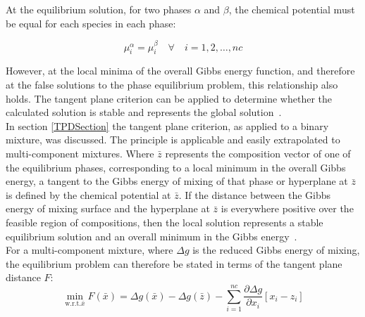 At the equilibrium solution, for two phases $\alpha$ and $\beta$, the chemical potential must be equal for each species in each phase:\

\begin{equation}
\mu_{i}^{\alpha} = \mu_{i}^{\beta} \quad \forall \quad i = 1, 2,\ldots, nc
\end{equation}
	

However, at the local  minima of the overall Gibbs energy function, and therefore at the false solutions to the phase equilibrium problem, this relationship also holds. The tangent plane criterion can be applied to determine whether the calculated solution is stable and represents the global solution~\cite{GlobalOptAndAnalysisGibbsEnergy, ThermodynamicModels, GlobalOptPhaseAndChemicalEquil}.\\

In section \ref{TPDSection} the tangent plane criterion, as applied to a binary mixture, was discussed. The principle is applicable and easily extrapolated to multi-component mixtures. Where $\bar{z}$ represents the composition vector  of one of the equilibrium phases, corresponding to a local minimum in the overall Gibbs energy, a tangent to the Gibbs energy of mixing of that phase or hyperplane at $\bar{z}$ is defined by the chemical potential at $\bar{z}$. If the distance between the Gibbs energy of mixing surface and the hyperplane at $\bar{z}$ is everywhere positive over the feasible region of compositions, then the local solution represents a stable equilibrium solution and an overall minimum in the Gibbs energy~\cite{GlobalOptAndAnalysisGibbsEnergy, ThermodynamicModels, ReliablePhaseStability}.\\

For a multi-component mixture, where $\Delta g$ is the reduced Gibbs energy of mixing, the equilibrium problem can therefore be stated in terms of the tangent plane distance $F$:\
\begin{equation}
\min_{\mathrm{w.r.t.} \bar{x}} F\left(\bar{x}\right) = \Delta g\left(\bar{x}\right) -\Delta g\left(\bar{z}\right) - \sum_{i=1}^{nc} \dfrac{\partial \Delta g}{\partial x_{i}}\left[x_{i}-z_{i}\right]\label{TangentPlaneGoal}
\end{equation}\

